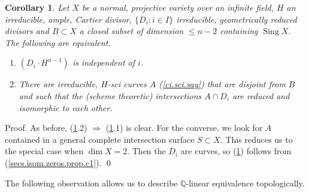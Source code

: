 \documentclass{amsart}
\newtheorem{cor}[thm]{Corollary}
\theoremstyle{definition}
\theoremstyle{remark}
\newcommand{\q}[0]{{\mathbb Q}}
\newcommand{\sing}[0]{\operatorname{Sing}}
\begin{document}
\begin{cor} \label{secs.isom.zeros.prop.c2}
Let $X$ be a normal, projective variety  over an infinite field, $H$ an irreducible, ample,  Cartier divisor,
 $\{D_i:i\in I\}$ irreducible, geometrically reduced  divisors
and $B\subset X$  a closed  subset of dimension $\leq n-2$ containing $\sing X$. 
The following are equivalent.
\begin{enumerate}
\item $(D_i\cdot H^{n-1})$ is independent of $i$. 
\item There are irreducible,    $H$-sci curves $A$ (\ref{ci.sci.say}) that are disjoint from $B$ and such that the (scheme theoretic) intersections
$A\cap D_i$ are reduced and  isomorphic to each other. 
\end{enumerate}
\end{cor}


Proof. As before, (\ref{secs.isom.zeros.prop.c2}.2)  $\Rightarrow$ (\ref{secs.isom.zeros.prop.c2}.1) is clear.
For the converse, we look for  $A$ contained in a 
general complete intersection surface $S\subset X$. 
This reduces us to the special case when $\dim X=2$. Then the $D_i$ are curves, so  (\ref{secs.isom.zeros.prop.c2}) 
follows from (\ref{secs.isom.zeros.prop.c1}). \qed

\medskip

The following observation allows us to describe $\q$-linear equivalence topologically.
\end{document}

